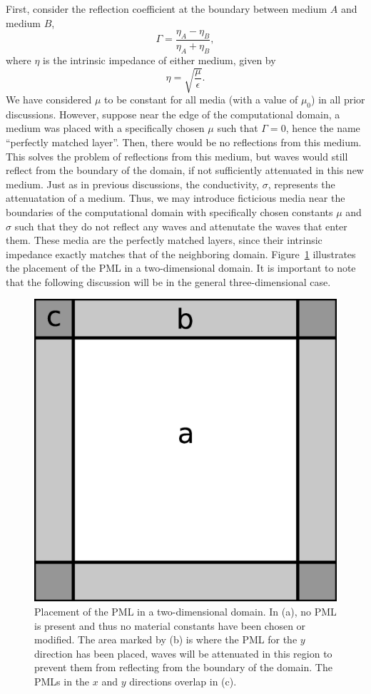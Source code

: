 \documentclass[12pt,twocolumn]{article}
\begin{document}
First, consider the reflection coefficient at the boundary between medium $A$ and medium $B$,
\begin{equation}
\Gamma = \frac{\eta_A-\eta_B}{\eta_A+\eta_B},
\end{equation}
where $\eta$ is the intrinsic impedance of either medium, given by
\begin{equation}
\eta=\sqrt{\frac{\mu}{\epsilon}}.
\end{equation}
We have considered $\mu$ to be constant for all media (with a value of $\mu_0$) in all prior discussions. However, suppose near the edge of the computational domain, a medium was placed with a specifically chosen $\mu$ such that $\Gamma=0$, hence the name ``perfectly matched layer''. Then, there would be no reflections from this medium. This solves the problem of reflections from this medium, but waves would still reflect from the boundary of the domain, if not sufficiently attenuated in this new medium. Just as in previous discussions, the conductivity, $\sigma$, represents the attenuatation of a medium. Thus, we may introduce ficticious media near the boundaries of the computational domain with specifically chosen constants $\mu$ and $\sigma$ such that they do not reflect any waves and attenutate the waves that enter them. These media are the perfectly matched layers, since their intrinsic impedance exactly matches that of the neighboring domain. Figure~\ref{fig:PML} illustrates the placement of the PML in a two-dimensional domain. It is important to note that the following discussion will be in the general three-dimensional case.
\begin{figure}
\centering
\includegraphics[width=0.5\linewidth]{PML.eps}
\caption{Placement of the PML in a two-dimensional domain. In (a), no PML is present and thus no material constants have been chosen or modified. The area marked by (b) is where the PML for the $y$ direction has been placed, waves will be attenuated in this region to prevent them from reflecting from the boundary of the domain. The PMLs in the $x$ and $y$ directions overlap in (c).}
\label{fig:PML}
\end{figure}
\end{document}
